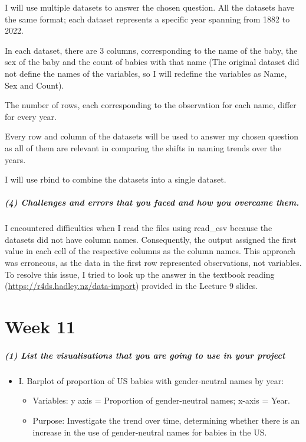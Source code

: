 \documentclass[
]{article}
\providecommand{\tightlist}{%
  \setlength{\itemsep}{0pt}\setlength{\parskip}{0pt}}
\begin{document}
I will use multiple datasets to answer the chosen question. All the
datasets have the same format; each dataset represents a specific year
spanning from 1882 to 2022.

In each dataset, there are 3 columns, corresponding to the name of the
baby, the sex of the baby and the count of babies with that name (The
original dataset did not define the names of the variables, so I will
redefine the variables as Name, Sex and Count).

The number of rows, each corresponding to the observation for each name,
differ for every year.

Every row and column of the datasets will be used to answer my chosen
question as all of them are relevant in comparing the shifts in naming
trends over the years.

I will use rbind to combine the datasets into a single dataset.

\hypertarget{challenges-and-errors-that-you-faced-and-how-you-overcame-them.}{%
\subparagraph{\texorpdfstring{\textbf{(4) Challenges and errors that you
faced and how you overcame
them.}}{(4) Challenges and errors that you faced and how you overcame them.}}\label{challenges-and-errors-that-you-faced-and-how-you-overcame-them.}}

I encountered difficulties when I read the files using read\_csv because
the datasets did not have column names. Consequently, the output
assigned the first value in each cell of the respective columns as the
column names. This approach was erroneous, as the data in the first row
represented observations, not variables. To resolve this issue, I tried
to look up the answer in the textbook reading
(\url{https://r4ds.hadley.nz/data-import}) provided in the Lecture 9
slides.

\hypertarget{week-11}{%
\section{Week 11}\label{week-11}}

\hypertarget{list-the-visualisations-that-you-are-going-to-use-in-your-project}{%
\subparagraph{\texorpdfstring{\textbf{(1) List the visualisations that
you are going to use in your project
}}{(1) List the visualisations that you are going to use in your project }}\label{list-the-visualisations-that-you-are-going-to-use-in-your-project}}

\begin{itemize}
\tightlist
\item
  I. Barplot of proportion of US babies with gender-neutral names by
  year:

  \begin{itemize}
  \tightlist
  \item
    Variables: y axis = Proportion of gender-neutral names; x-axis =
    Year.
  \item
    Purpose: Investigate the trend over time, determining whether there
    is an increase in the use of gender-neutral names for babies in the
    US.
  \end{itemize}
\end{itemize}
\end{document}
